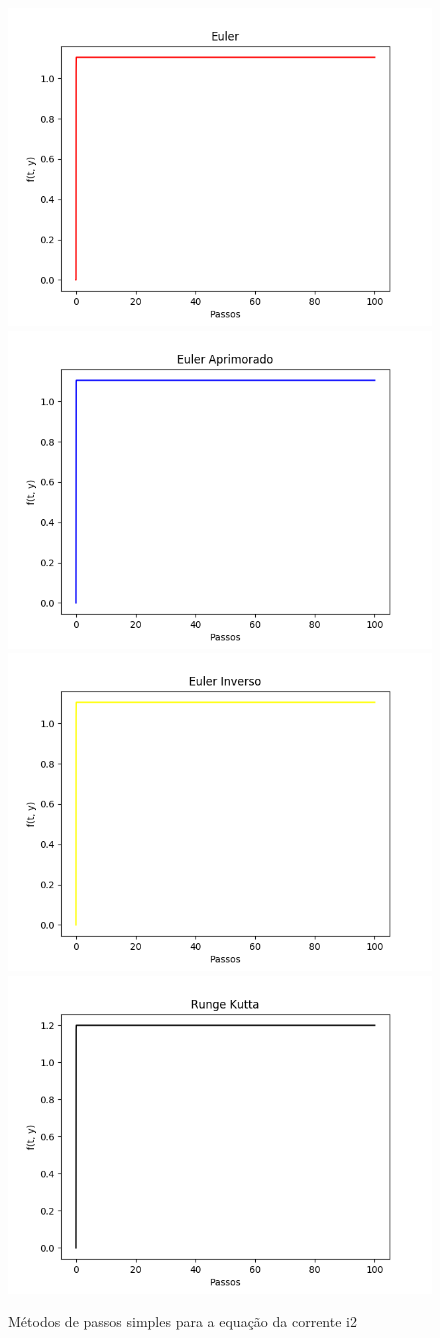 \documentclass[12pt]{article}%
\begin{document}
    \begin{figure}[H]
        \begin{center}
            \includegraphics[width=.4\textwidth]{problemas/metodos_q2/circuito2_euler.png}
            \includegraphics[width=.4\textwidth]{problemas/metodos_q2/circuito2_euler_aprimorado.png}
            \includegraphics[width=.4\textwidth]{problemas/metodos_q2/circuito2_euler_inverso.png}
            \includegraphics[width=.4\textwidth]{problemas/metodos_q2/circuito2_runge_kutta.png}
        \end{center}
        \caption{Métodos de passos simples para a equação da corrente i2}
    \end{figure}
    
\end{document}
